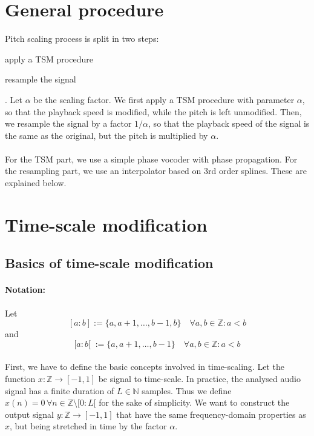 \documentclass[letterpaper]{article}
\begin{document}
\section{General procedure}
Pitch scaling process is split in two steps: \begin{enumerate*}[label=\arabic*)]
\item apply a TSM procedure \item resample the signal\end{enumerate*}. Let
\(\alpha\) be the scaling factor. We first apply a TSM procedure with parameter
\(\alpha\), so that the playback speed is modified, while the pitch is left
unmodified. Then, we resample the signal by a factor \(1/\alpha\), so that the
playback speed of the signal is the same as the original, but the pitch is
multiplied by \(\alpha\).
\paragraph{}
For the TSM part, we use a simple phase vocoder with phase propagation. For the
resampling part, we use an interpolator based on 3rd order splines. These are
explained below.

\section{Time-scale modification}
\subsection{Basics of time-scale modification}
\paragraph{Notation:} Let
\[[a:b]:=\{a,a+1,\dots,b-1,b\}\quad\forall a,b\in\mathbb{Z}:a<b\]
and
\[[a:b[\;:=\{a,a+1,\dots,b-1\}\quad\forall a,b\in\mathbb{Z}:a<b\]
\paragraph{}
First, we have to define the basic concepts involved in time-scaling. Let the
function \(x:\mathbb{Z}\to[-1, 1]\) be signal to time-scale. In practice,
the analysed audio signal has a finite duration of \(L\in\mathbb{N}\) samples.
Thus we define \(x(n)=0\,\forall n\in\mathbb{Z}\setminus [0:L[ \) for the sake
of simplicity. We want to construct the output signal
\(y:\mathbb{Z}\to[-1, 1]\) that have the same frequency-domain properties as
\(x\), but being stretched in time by the factor \(\alpha\).
\end{document}
